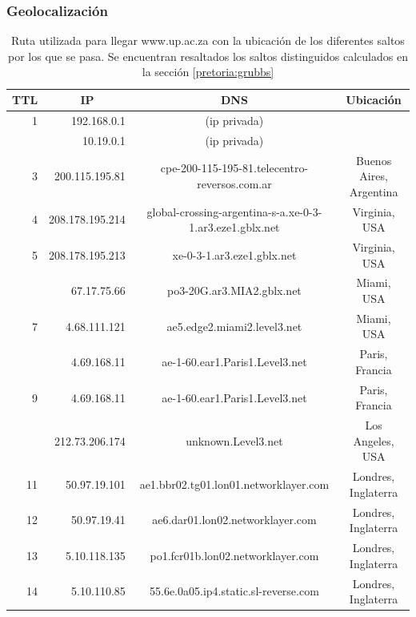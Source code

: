 \subsubsection{Geolocalización}

\begin{table}[H]
    \begin{center}
        \begin{tabular}{| r | r | c | c |}
  \hline
  {\bf TTL} & \multicolumn{1}{|c|}{\bf IP} & {\bf DNS} & {\bf Ubicación}\\
  \hline
\hline 1  & 192.168.0.1 & (ip privada) & \\
\rowcolor{blue!25}\hline 2  & 10.19.0.1 & (ip privada) & \\
\hline 3  & 200.115.195.81 & cpe-200-115-195-81.telecentro-reversos.com.ar & Buenos Aires, Argentina\\
\hline 4  & 208.178.195.214 & global-crossing-argentina-s-a.xe-0-3-1.ar3.eze1.gblx.net & Virginia, USA\\ 
\hline 5  & 208.178.195.213 & xe-0-3-1.ar3.eze1.gblx.net & Virginia, USA\\ 
\rowcolor{blue!25}\hline 6  & 67.17.75.66 &  po3-20G.ar3.MIA2.gblx.net & Miami, USA\\ 
\hline 7  & 4.68.111.121 &  ae5.edge2.miami2.level3.net  & Miami, USA\\ 
\rowcolor{blue!25}\hline 8  & 4.69.168.11 & ae-1-60.ear1.Paris1.Level3.net & Paris, Francia\\ 
\hline 9  & 4.69.168.11 & ae-1-60.ear1.Paris1.Level3.net & Paris, Francia\\ 
\rowcolor{blue!25}\hline 10  & 212.73.206.174 & unknown.Level3.net & Los Angeles, USA\\ 
\hline 11  & 50.97.19.101 & ae1.bbr02.tg01.lon01.networklayer.com & Londres, Inglaterra\\ 
\hline 12  & 50.97.19.41 & ae6.dar01.lon02.networklayer.com & Londres, Inglaterra\\ 
\hline 13  & 5.10.118.135 & po1.fcr01b.lon02.networklayer.com & Londres, Inglaterra\\ 
\hline 14  & 5.10.110.85 &  55.6e.0a05.ip4.static.sl-reverse.com & Londres, Inglaterra\\ 
\hline
        \end{tabular}
        \caption{Ruta utilizada para llegar www.up.ac.za con la ubicación de los diferentes saltos por los que se pasa. Se encuentran resaltados los saltos distinguidos calculados en la sección \ref{pretoria:grubbs}}
        \label{table:pretoria} 
    \end{center}
\end{table}


